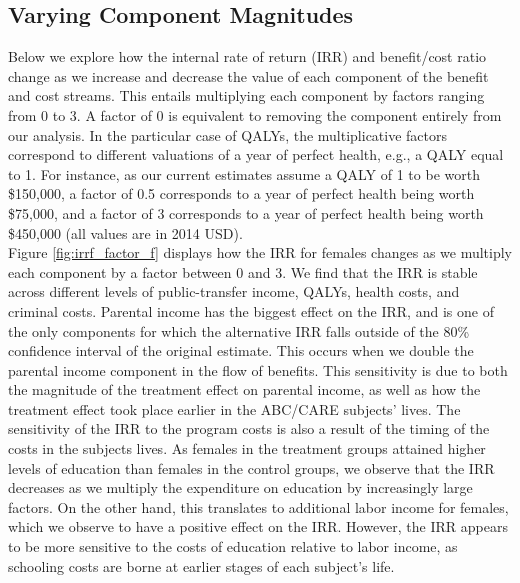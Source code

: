 \subsection{Varying Component Magnitudes}
\label{app:sa_factors}

\noindent Below we explore how the internal rate of return (IRR) and benefit/cost ratio change as
we increase and decrease the value of each component of the benefit and cost streams. This entails
multiplying each component by factors ranging from 0 to 3. A factor of 0 is equivalent
to removing the component entirely from our analysis. In the particular
case of QALYs, the multiplicative factors correspond to different valuations of a year of perfect
health, e.g., a QALY equal to 1. For instance, as our current estimates assume a QALY of 1 to be worth
\$150,000, a factor of 0.5 corresponds to a year of perfect health being
worth \$75,000, and a factor of 3 corresponds to a year of perfect health
being worth \$450,000 (all values are in 2014 USD). \\

\noindent Figure \ref{fig:irrf_factor_f} displays how the IRR for females
changes as we multiply each component by a factor between 0 and 3. We find that the IRR
is stable across different levels of public-transfer income, QALYs, health costs, and criminal 
costs. Parental income has the biggest effect on the IRR, 
and is one of the only components for which the alternative IRR falls outside of the 80\% confidence 
interval of the original estimate. This occurs when we double the parental income component in the
flow of benefits. 
 This sensitivity is due to both the magnitude of the
treatment effect on parental income, as well as how the treatment effect took place
earlier in the ABC/CARE subjects' lives. The sensitivity of the IRR to the program costs
is also a result of the timing of the costs in the subjects lives. As females in the treatment groups attained higher levels of education
than females in the control groups, we observe that the IRR decreases as we multiply the
expenditure on education by increasingly large factors. On the other hand, this translates
to additional labor income for females, which we observe to have a positive effect on the
IRR. However, the IRR appears to be more sensitive to the costs of education relative
to labor income, as schooling costs are borne at earlier stages of each subject's life. 


